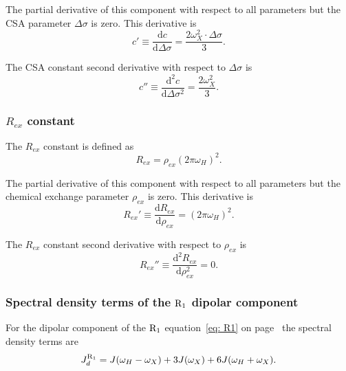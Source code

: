 \noindent The partial derivative of this component with respect to all parameters but the CSA parameter $\Delta\sigma$ is zero.  This derivative is
\begin{equation}
    c' \equiv \frac{\mathrm{d} c}{\mathrm{d} \Delta\sigma} = \frac{2 \omega_X^2 \cdot \Delta\sigma}{3}. \label{eq: Ri': c'}
\end{equation}

\noindent The CSA constant second derivative with respect to $\Delta\sigma$ is
\begin{equation}
    c'' \equiv \frac{\mathrm{d}^2 c}{\mathrm{d} \Delta\sigma^2} = \frac{2 \omega_X^2}{3}. \label{eq: Ri': c"}
\end{equation}


\subsubsection{$R_{ex}$ constant}

The $R_{ex}$ constant is defined as
\begin{equation}
    R_{ex} = \rho_{ex} (2 \pi \omega_H)^2 . \label{eq: Ri': Rex}
\end{equation}

\noindent The partial derivative of this component with respect to all parameters but the chemical exchange parameter $\rho_{ex}$ is zero.  This derivative is
\begin{equation}
    R_{ex}' \equiv \frac{\mathrm{d} R_{ex}}{\mathrm{d} \rho_{ex}} = (2 \pi \omega_H)^2. \label{eq: Ri': Rex'}
\end{equation}

\noindent The $R_{ex}$ constant second derivative with respect to $\rho_{ex}$ is
\begin{equation}
    R_{ex}'' \equiv \frac{\mathrm{d}^2 R_{ex}}{\mathrm{d} \rho_{ex}^2} = 0. \label{eq: Ri': Rex"}
\end{equation}


\subsubsection{Spectral density terms of the $\mathrm{R}_1$ dipolar component}

For the dipolar component of the $\mathrm{R}_1$ equation~\eqref{eq: R1} on page~\pageref{eq: R1} the spectral density terms are
\begin{equation}
    J_d^{\mathrm{R}_1} = J(\omega_H - \omega_X) + 3J(\omega_X) + 6J(\omega_H + \omega_X).  \label{eq: J terms: JR1d}
\end{equation}

